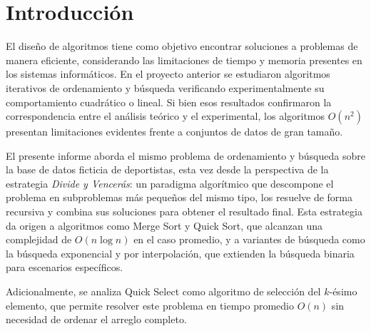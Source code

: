 \section{Introducción}\label{sec:introduccion}
El diseño de algoritmos tiene como objetivo encontrar soluciones a problemas de manera eficiente, considerando las limitaciones de tiempo y memoria presentes en los sistemas informáticos. En el proyecto anterior se estudiaron algoritmos iterativos de ordenamiento y búsqueda verificando experimentalmente su comportamiento cuadrático o lineal. Si bien esos resultados confirmaron la correspondencia entre el análisis teórico y el experimental, los algoritmos $O(n^2)$ presentan limitaciones evidentes frente a conjuntos de datos de gran tamaño.

El presente informe aborda el mismo problema de ordenamiento y búsqueda sobre la base de datos ficticia de deportistas, esta vez desde la perspectiva de la estrategia \textit{Divide y Vencerás}: un paradigma algorítmico que descompone el problema en subproblemas más pequeños del mismo tipo, los resuelve de forma recursiva y combina sus soluciones para obtener el resultado final. Esta estrategia da origen a algoritmos como Merge Sort y Quick Sort, que alcanzan una complejidad de $O(n \log n)$ en el caso promedio, y a variantes de búsqueda como la búsqueda exponencial y por interpolación, que extienden la búsqueda binaria para escenarios específicos.

Adicionalmente, se analiza Quick Select como algoritmo de selección del $k$-ésimo elemento, que permite resolver este problema en tiempo promedio $O(n)$ sin necesidad de ordenar el arreglo completo.